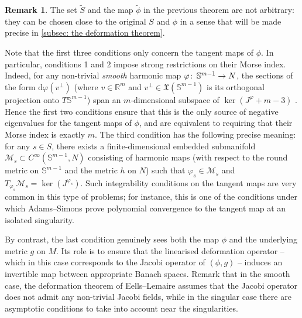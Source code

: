 \documentclass{article}
\numberwithin{equation}{section}        %
\theoremstyle{bfnote}
\theoremstyle{definition}
\theoremstyle{bfremark}
\newtheorem{rem}[thm]{Remark}               %
\newcommand{\col}{\colon \thinspace}        %
\newcommand{\R}{\mathbb{R}}                 %
\newcommand{\Sp}{\mathbb{S}}                %
\newcommand{\diff}{\mathrm{d}}                      %
\begin{document}
\begin{rem}
    The set $\tilde{S}$ and the map $\tilde{\phi}$ in the previous theorem are not arbitrary: they can be chosen close to the original $S$ and $\phi$ in a sense that will be made precise in \cref{subsec: the deformation theorem}.
\end{rem}

Note that the first three conditions only concern the tangent maps of $\phi$. In particular, conditions 1 and 2 impose strong restrictions on their Morse index. Indeed, for any non-trivial \emph{smooth} harmonic map $\varphi \col \Sp^{m-1} \to N$, the sections of the form $\diff \varphi(v^\perp)$ (where $v \in \R^m$ and $v^\perp \in \mathfrak{X}(\Sp^{m-1})$ is its orthogonal projection onto $T\Sp^{m-1}$) span an $m$-dimensional subspace of $\ker(J^\varphi + m-3)$ \cite{elsoufi1995indice}. Hence the first two conditions ensure that this is the only source of negative eigenvalues for the tangent maps of $\phi$, and are equivalent to requiring that their Morse index is exactly $m$. The third condition has the following precise meaning: for any $s \in S$, there exists a finite-dimensional embedded submanifold $\mathcal{M}_s \subset C^\infty(\Sp^{m-1},N)$ consisting of harmonic maps (with respect to the round metric on $\Sp^{m-1}$ and the metric $h$ on $N$) such that $\varphi_s \in \mathcal{M}_s$ and $T_{\varphi_s} \mathcal{M}_s = \ker(J^{\varphi_s})$. Such integrability conditions on the tangent maps are very common in this type of problems; for instance, this is one of the conditions under which Adams--Simons \cite{adams1988rates} prove polynomial convergence to the tangent map at an isolated singularity. 

By contrast, the last condition genuinely sees both the map $\phi$ and the underlying metric $g$ on $M$. Its role is to ensure that the linearised deformation operator -- which in this case corresponds to the Jacobi operator of $(\phi,g)$ -- induces an invertible map between appropriate Banach spaces. Remark that in the smooth case, the deformation theorem of Eells--Lemaire assumes that the Jacobi operator does not admit any non-trivial Jacobi fields, while in the singular case there are asymptotic conditions to take into account near the singularities. 
\end{document}
